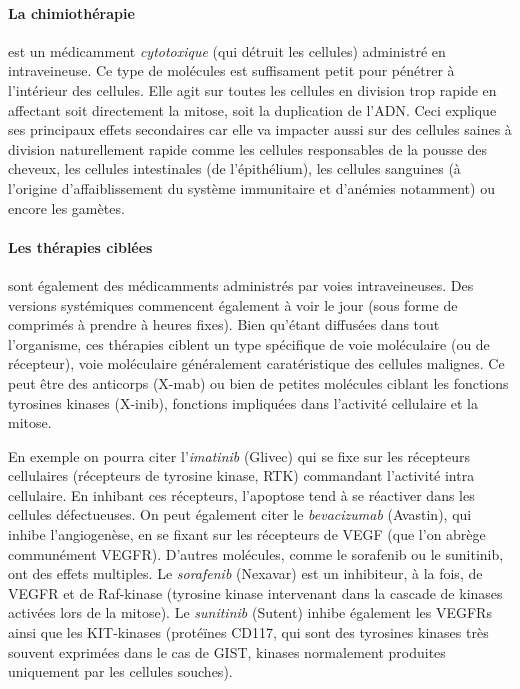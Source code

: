 \documentclass[main.tex]{subfiles}
\begin{document}
\paragraph{La chimiothérapie} est un médicamment \emph{cytotoxique} (\ie qui détruit les cellules) administré en intraveineuse. 
Ce type de molécules est suffisament petit pour pénétrer à l'intérieur des cellules. Elle agit sur toutes les cellules en division trop rapide en affectant soit directement la mitose, soit la duplication de l'ADN. Ceci explique ses principaux effets secondaires car elle va impacter aussi sur des cellules saines à division naturellement rapide comme les cellules responsables de la pousse des cheveux, les cellules intestinales (de l'épithélium), les cellules sanguines (à l'origine d'affaiblissement du système immunitaire et d'anémies notamment) ou encore les gamètes.

\paragraph{Les thérapies ciblées} sont également des médicamments administrés par voies intraveineuses. Des versions systémiques commencent également à voir le jour (\ie sous forme de comprimés à prendre à heures fixes). Bien qu'étant diffusées dans tout l'organisme, ces thérapies  ciblent un type spécifique de voie moléculaire (ou de récepteur), voie moléculaire généralement caratéristique des cellules malignes. Ce peut être des anticorps (X-mab) ou bien de petites molécules ciblant les fonctions tyrosines kinases (X-inib), fonctions impliquées dans l'activité cellulaire et la mitose. 

En exemple on pourra citer l'\emph{imatinib} (Glivec) qui se fixe sur les récepteurs cellulaires (récepteurs de tyrosine kinase, RTK) commandant l'activité intra cellulaire. En inhibant ces récepteurs, l'apoptose tend à se réactiver dans les cellules défectueuses. On peut également citer le \emph{bevacizumab} (Avastin), qui inhibe l'angiogenèse, en se fixant sur les récepteurs de VEGF (que l'on abrège communément VEGFR). D'autres molécules, comme  le sorafenib ou le sunitinib, ont des effets multiples. 
Le \emph{sorafenib} (Nexavar) est un inhibiteur, à la fois, de VEGFR et de Raf-kinase (tyrosine kinase intervenant dans la cascade de kinases activées lors de la mitose). 
Le \emph{sunitinib} (Sutent) inhibe également les VEGFRs ainsi que les KIT-kinases (protéïnes CD117, qui sont des tyrosines kinases très souvent exprimées dans le cas de GIST, kinases normalement produites uniquement par les cellules souches).
\end{document}
